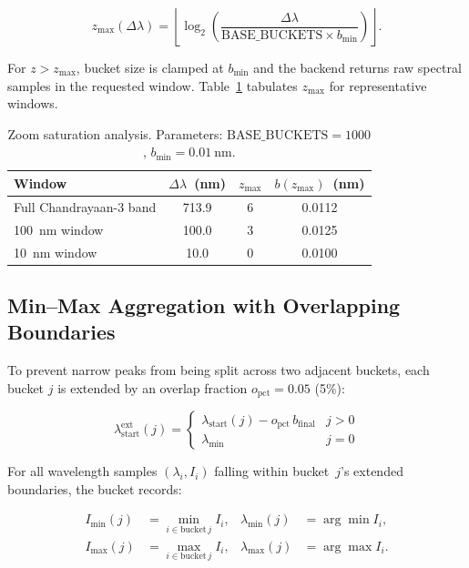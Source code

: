 \documentclass[a4paper,twocolumn,10pt]{article}
\begin{document}
\begin{equation}
\label{eq:zmax}
z_{\max}(\Delta\lambda) =
  \left\lfloor \log_2\!\left(
    \frac{\Delta\lambda}{\text{BASE\_BUCKETS} \times b_{\min}}
  \right)\right\rfloor.
\end{equation}

For $z > z_{\max}$, bucket size is clamped at $b_{\min}$ and the
backend returns raw spectral samples in the requested window.
Table~\ref{tab:zmax} tabulates $z_{\max}$ for representative windows.

\begin{table}[htbp]
\centering
\caption{Zoom saturation analysis.  Parameters:
  $\text{BASE\_BUCKETS} = 1000$, $b_{\min} = \SI{0.01}{\nano\metre}$.}
\label{tab:zmax}
\begin{tabularx}{\columnwidth}{X c c c}
\toprule
\textbf{Window} & $\Delta\lambda$~(nm) & $z_{\max}$ & $b(z_{\max})$~(nm) \\
\midrule
Full Chandrayaan-3 band & 713.9 & 6 & 0.0112 \\
100~nm window           & 100.0 & 3 & 0.0125 \\
10~nm window            & 10.0  & 0 & 0.0100 \\
\bottomrule
\end{tabularx}
\end{table}

\subsection{Min--Max Aggregation with Overlapping Boundaries}

To prevent narrow peaks from being split across two adjacent buckets,
each bucket $j$ is extended by an overlap fraction
$o_{\text{pct}} = 0.05$ (5\%):

\begin{equation}
\lambda_{\text{start}}^{\text{ext}}(j) =
  \begin{cases}
    \lambda_{\text{start}}(j) - o_{\text{pct}}\,b_{\text{final}} & j > 0 \\
    \lambda_{\min} & j = 0
  \end{cases}
\end{equation}

For all wavelength samples $(\lambda_i, I_i)$ falling within
bucket~$j$'s extended boundaries, the bucket records:

\begin{align}
I_{\min}(j) &= \min_{i \in \text{bucket}\,j} I_i, &
\lambda_{\min}(j) &= \arg\min I_i, \\
I_{\max}(j) &= \max_{i \in \text{bucket}\,j} I_i, &
\lambda_{\max}(j) &= \arg\max I_i.
\end{align}
\end{document}

